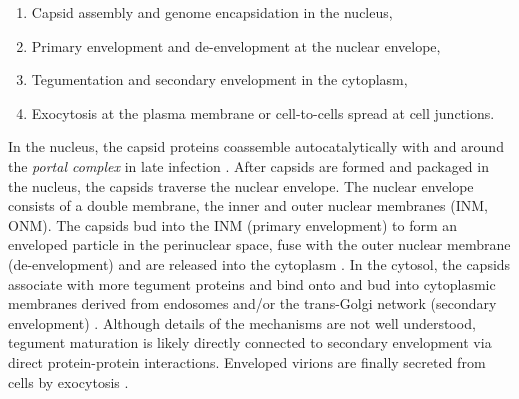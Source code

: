 \begin{samepage}
  \begin{enumerate}
    \item Capsid assembly and genome encapsidation in the nucleus,
    \item Primary envelopment and de-envelopment at the nuclear envelope,
    \item Tegumentation and secondary envelopment in the cytoplasm,
    \item Exocytosis at the plasma membrane or cell-to-cells spread at cell junctions.
  \end{enumerate}
\end{samepage}

In the nucleus, the capsid proteins coassemble autocatalytically with and around the \emph{portal complex} in late infection \cite{[4]}.
After capsids are formed and packaged in the nucleus, the capsids %
traverse the nuclear envelope.
The nuclear envelope consists of a double membrane, the inner and outer nuclear membranes (INM, ONM).
The capsids bud into the INM (primary envelopment) to form an enveloped particle in the perinuclear space, fuse with the outer nuclear membrane (de-envelopment) and are released into the cytoplasm \cite{[12]}. %
In the cytosol, the capsids associate with more tegument proteins and bind onto and bud into cytoplasmic membranes derived from endosomes and/or the trans-Golgi network (secondary envelopment) \cite{[13, 14]}.
Although details of the mechanisms are not well understood, tegument maturation is likely directly connected to secondary envelopment via direct protein-protein interactions.
Enveloped virions are finally secreted from cells by exocytosis \cite{[15, 16]}.

